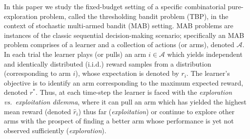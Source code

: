 In this paper we study the fixed-budget setting of a specific combinatorial pure-exploration problem, called the thresholding bandit problem (TBP), in the context of stochastic multi-armed bandit (MAB) setting. MAB problems are instances of the classic sequential decision-making scenario; specifically an MAB problem comprises of a learner and a collection of actions (or arms), denoted $\mathcal{A}$. In each trial the learner plays (or pulls) an arm $i\in\mathcal{A}$ which yields independent and identically distributed (i.i.d.) reward samples from a distribution (corresponding to arm $i$), whose expectation is denoted by $r_i$. 
The learner's objective is to identify an arm corresponding to the maximum expected reward, denoted $r^{*}$. Thus, at each time-step the learner 
is faced with the \emph{exploration vs.\ exploitation dilemma}, where it can pull an arm which has yielded the highest mean reward (denoted $\hat{r}_{i}$) thus far (\emph{exploitation}) or continue to explore other arms with the prospect of finding a better arm 
whose performance is yet not observed sufficiently (\emph{exploration}).


